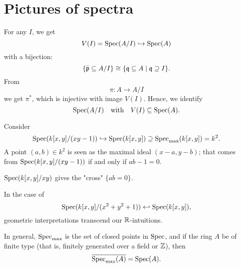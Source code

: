 \section{Pictures of spectra}

For any $I$, we get
\[ V(I) = \text{Spec}(A/{I}) \hookrightarrow \text{Spec}(A)\]
with a bijection:
\[\{ \bar{\mathfrak p} \subseteq A / I\} \cong \{ \mathfrak q \subseteq A \mathrel{|} \mathfrak q \supseteq I\}.\]
From
\[\pi: A \to A/{I}\]
we get $\pi^*$, which is injective with image $V(I)$. Hence, we identify
\[ \text{Spec}(A/I) \quad \text{with} \quad V(I) \subseteq \text{Spec}(A). \]

\begin{example}
  Consider
  \[ \text{Spec}(k[x,y]/(xy-1)) \hookrightarrow \text{Spec}(k[x,y]) \supseteq \text{Spec}_{\max}(k[x,y]) = k^2.\]
A point $(a, b) \in k^2$ is seen as the maximal ideal $(x-a,y-b)$; that comes from $\text{Spec}(k[x,y]/{(xy-1)})$ if and only if $ab-1 = 0$.
\end{example}

\begin{example}
  $\text{Spec} (k[x,y]/{xy})$ gives the "cross" $\{ ab=0 \}$.
\end{example}

\begin{example}
  In the case of
  \[\text{Spec}(k[x,y]/(x^2 + y^2 + 1)) \hookleftarrow \text{Spec}(k[x,y]),\]
  geometric interpretations transcend our $\mathbb R$-intuitions.
\end{example}


\begin{note}
  In general, $\text{Spec}_{\text{max}}$ is the set of closed points in $\text{Spec}$, and if the ring $A$ be of finite type (that is, finitely generated over a field or $\mathbb Z$), then
  \[ \overline{\text{Spec}_{\text{max}}(A)} = \text{Spec}(A).\]
\end{note}

